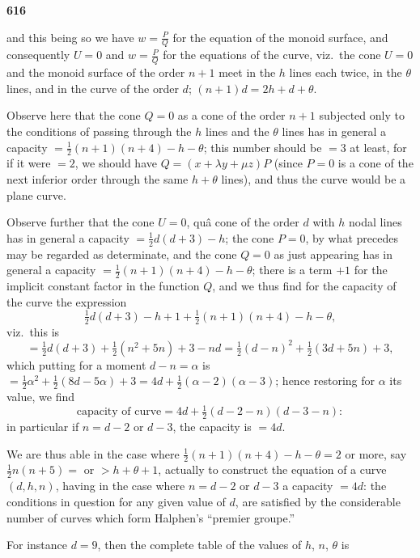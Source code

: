 \documentclass[12pt,a4paper]{article}
\theoremstyle{plain}
\begin{document}
\newpage
\noindent\textbf{616}

and this being so we have $w=\frac{P}{Q}$ for the equation of the monoid surface, and consequently $U=0$ and $w=\frac{P}{Q}$ for the equations of the curve, viz.~the cone $U=0$ and the monoid surface of the order $n+1$ meet in the $h$ lines each twice, in the $\theta$ lines, and in the curve of the order $d$; $(n+1)d = 2h + d + \theta$.

Observe here that the cone $Q=0$ as a cone of the order $n+1$ subjected only to the conditions of passing through the $h$ lines and the $\theta$ lines has in general a capacity $=\frac{1}{2}(n+1)(n+4)-h-\theta$; this number should be $=3$ at least, for if it were $=2$, we should have $Q=(x+\lambda y+\mu z)P$ (since $P=0$ is a cone of the next inferior order through the same $h+\theta$ lines), and thus the curve would be a plane curve.

Observe further that the cone $U=0$, qu\^{a} cone of the order $d$ with $h$ nodal lines has in general a capacity $=\frac{1}{2}d(d+3)-h$; the cone $P=0$, by what precedes may be regarded as determinate, and the cone $Q=0$ as just appearing has in general a capacity $=\frac{1}{2}(n+1)(n+4)-h-\theta$; there is a term $+1$ for the implicit constant factor in the function $Q$, and we thus find for the capacity of the curve the expression
\[\tfrac{1}{2}d(d+3)-h+1+\tfrac{1}{2}(n+1)(n+4)-h-\theta,\]
viz.~this is
\[= \tfrac{1}{2}d(d+3) + \tfrac{1}{2}(n^2+5n) + 3 - nd = \tfrac{1}{2}(d-n)^2 + \tfrac{1}{2}(3d+5n) + 3,\]
which putting for a moment $d-n=\alpha$ is $=\frac{1}{2}\alpha^2+\frac{1}{2}(8d-5\alpha)+3 = 4d+\frac{1}{2}(\alpha-2)(\alpha-3)$; hence restoring for $\alpha$ its value, we find
\[\text{capacity of curve} = 4d + \tfrac{1}{2}(d-2-n)(d-3-n):\]
in particular if $n=d-2$ or $d-3$, the capacity is $=4d$.

We are thus able in the case where $\frac{1}{2}(n+1)(n+4)-h-\theta=2$ or more, say $\frac{1}{2}n(n+5)=$ or $>h+\theta+1$, actually to construct the equation of a curve $(d,h,n)$, having in the case where $n=d-2$ or $d-3$ a capacity $=4d$: the conditions in question for any given value of $d$, are satisfied by the considerable number of curves which form Halphen's ``premier groupe.''

For instance $d=9$, then the complete table of the values of $h$, $n$, $\theta$ is
\end{document}
